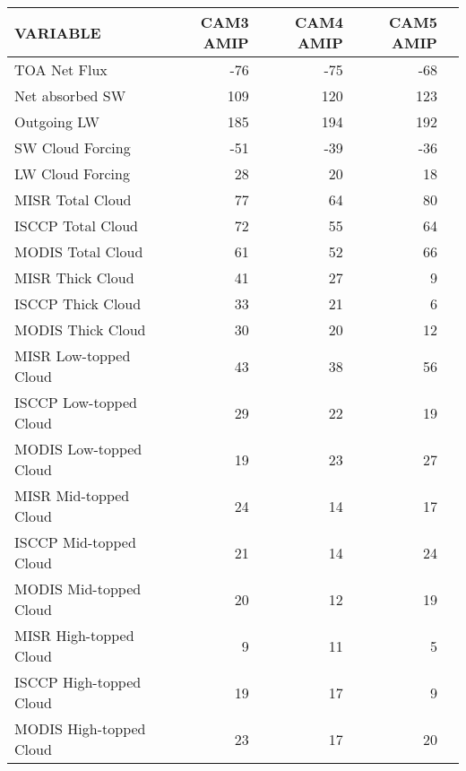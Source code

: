 \begin{tabular}{lrrrr}
\hline
                VARIABLE &                CAM3 AMIP &                CAM4 AMIP &                CAM5 AMIP \\ \hline
            TOA Net Flux &                      -76 &                      -75 &                      -68 \\
         Net absorbed SW &                      109 &                      120 &                      123 \\
             Outgoing LW &                      185 &                      194 &                      192 \\
        SW Cloud Forcing &                      -51 &                      -39 &                      -36 \\
        LW Cloud Forcing &                       28 &                       20 &                       18 \\
        MISR Total Cloud &                       77 &                       64 &                       80 \\
       ISCCP Total Cloud &                       72 &                       55 &                       64 \\
       MODIS Total Cloud &                       61 &                       52 &                       66 \\
        MISR Thick Cloud &                       41 &                       27 &                        9 \\
       ISCCP Thick Cloud &                       33 &                       21 &                        6 \\
       MODIS Thick Cloud &                       30 &                       20 &                       12 \\
   MISR Low-topped Cloud &                       43 &                       38 &                       56 \\
  ISCCP Low-topped Cloud &                       29 &                       22 &                       19 \\
  MODIS Low-topped Cloud &                       19 &                       23 &                       27 \\
   MISR Mid-topped Cloud &                       24 &                       14 &                       17 \\
  ISCCP Mid-topped Cloud &                       21 &                       14 &                       24 \\
  MODIS Mid-topped Cloud &                       20 &                       12 &                       19 \\
  MISR High-topped Cloud &                        9 &                       11 &                        5 \\
 ISCCP High-topped Cloud &                       19 &                       17 &                        9 \\
 MODIS High-topped Cloud &                       23 &                       17 &                       20 \\ \hline
\end{tabular}
